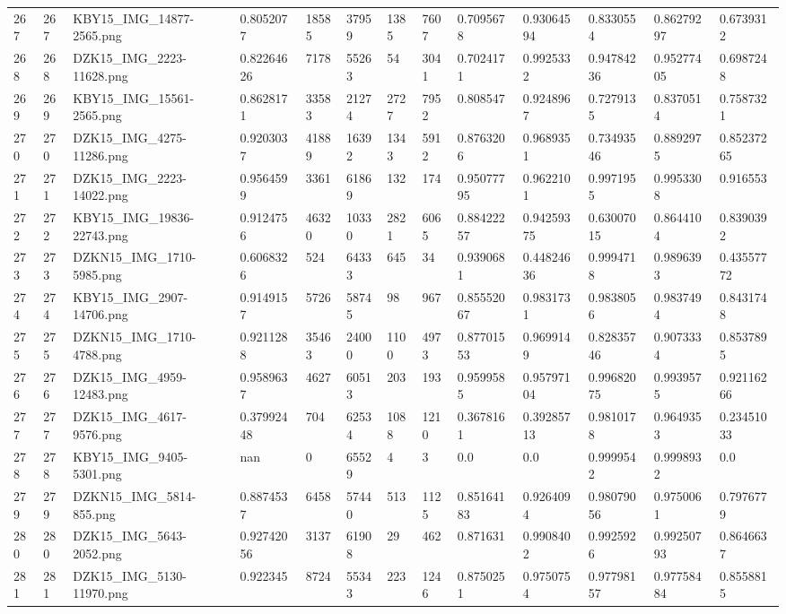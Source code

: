\documentclass[11pt, a4paper, twoside]{report}
\begin{document}
\begin{longtable}[c]{@{}lllllllllllll@{}}
267 & 267 & KBY15\_IMG\_14877-2565.png & 0.8052077 & 18585 & 37959 & 1385 & 7607 & 0.7095678 & 0.93064594 & 0.8330554 & 0.86279297 & 0.6739312 \\
268 & 268 & DZK15\_IMG\_2223-11628.png & 0.82264626 & 7178 & 55263 & 54 & 3041 & 0.7024171 & 0.9925332 & 0.94784236 & 0.95277405 & 0.6987248 \\
269 & 269 & KBY15\_IMG\_15561-2565.png & 0.8628171 & 33583 & 21274 & 2727 & 7952 & 0.808547 & 0.9248967 & 0.7279135 & 0.8370514 & 0.7587321 \\
270 & 270 & DZK15\_IMG\_4275-11286.png & 0.9203037 & 41889 & 16392 & 1343 & 5912 & 0.8763206 & 0.9689351 & 0.73493546 & 0.8892975 & 0.85237265 \\
271 & 271 & DZK15\_IMG\_2223-14022.png & 0.9564599 & 3361 & 61869 & 132 & 174 & 0.95077795 & 0.9622101 & 0.9971955 & 0.9953308 & 0.916553 \\
272 & 272 & KBY15\_IMG\_19836-22743.png & 0.9124756 & 46320 & 10330 & 2821 & 6065 & 0.88422257 & 0.94259375 & 0.63007015 & 0.8644104 & 0.8390392 \\
273 & 273 & DZKN15\_IMG\_1710-5985.png & 0.6068326 & 524 & 64333 & 645 & 34 & 0.9390681 & 0.44824636 & 0.9994718 & 0.9896393 & 0.43557772 \\
274 & 274 & KBY15\_IMG\_2907-14706.png & 0.9149157 & 5726 & 58745 & 98 & 967 & 0.85552067 & 0.9831731 & 0.9838056 & 0.9837494 & 0.8431748 \\
275 & 275 & DZKN15\_IMG\_1710-4788.png & 0.9211288 & 35463 & 24000 & 1100 & 4973 & 0.87701553 & 0.9699149 & 0.82835746 & 0.9073334 & 0.8537895 \\
276 & 276 & DZK15\_IMG\_4959-12483.png & 0.9589637 & 4627 & 60513 & 203 & 193 & 0.9599585 & 0.95797104 & 0.99682075 & 0.9939575 & 0.92116266 \\
277 & 277 & DZK15\_IMG\_4617-9576.png & 0.37992448 & 704 & 62534 & 1088 & 1210 & 0.3678161 & 0.39285713 & 0.9810178 & 0.9649353 & 0.23451033 \\
278 & 278 & KBY15\_IMG\_9405-5301.png & nan & 0 & 65529 & 4 & 3 & 0.0 & 0.0 & 0.9999542 & 0.9998932 & 0.0 \\
279 & 279 & DZKN15\_IMG\_5814-855.png & 0.8874537 & 6458 & 57440 & 513 & 1125 & 0.85164183 & 0.9264094 & 0.98079056 & 0.9750061 & 0.7976779 \\
280 & 280 & DZK15\_IMG\_5643-2052.png & 0.92742056 & 3137 & 61908 & 29 & 462 & 0.871631 & 0.9908402 & 0.9925926 & 0.99250793 & 0.8646637 \\
281 & 281 & DZK15\_IMG\_5130-11970.png & 0.922345 & 8724 & 55343 & 223 & 1246 & 0.8750251 & 0.9750754 & 0.97798157 & 0.97758484 & 0.8558815 \\

\end{longtable}
\end{document}

